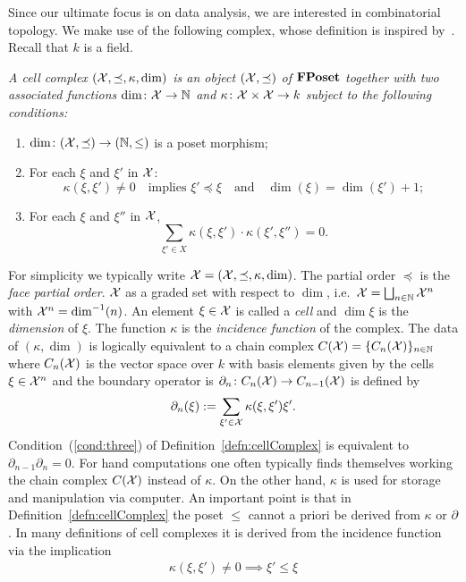 Since our ultimate focus is on data analysis, we are interested in combinatorial topology.  We make use of the following complex, whose definition is inspired by~\cite{lefschetz}.  Recall that $k$ is a field.

\begin{defn}
\label{defn:cellComplex}
{\em
A {\em cell complex} $({\mathcal X},\preceq,\kappa,\dim)$ is an object $({\mathcal X},\preceq)$ of ${\bf FPoset}$ together with two associated functions $\dim\colon {\mathcal X}\to {\mathbb{N}}$ and $\kappa\colon {\mathcal X}\times {\mathcal X}\to k$ subject to the following conditions:
\begin{enumerate}
\item $\dim\colon({\mathcal X},\preceq)\to ({\mathbb{N}},\leq)$ is a poset morphism;
\item  For each $\xi$ and $\xi'$ in ${\mathcal X}$:
\[
\kappa(\xi,\xi')\neq 0\quad\text{implies } \xi'\preceq \xi \quad\text{and}\quad \dim(\xi) = \dim(\xi')+1;
\]
\item\label{cond:three} For each $\xi$ and $\xi''$ in ${\mathcal X}$,
\[
\sum_{\xi'\in X} \kappa(\xi,\xi')\cdot \kappa(\xi',\xi'')=0.
\]
\end{enumerate}
}
\end{defn}

For simplicity we typically write ${\mathcal X}=({\mathcal X},\preceq,\kappa,\dim)$.  
The partial order $\preceq$ is the {\em face partial order}.
${\mathcal X}$ as a graded set with respect to $\dim$, i.e.\ ${\mathcal X} = \bigsqcup_{n\in {\mathbb{N}}} {\mathcal X}^n$ with ${\mathcal X}^n = \dim^{-1}(n)$.  
An element $\xi\in {\mathcal X}$ is called a {\em cell} and $\dim \xi$ is the {\em dimension} of $\xi$. 
The function $\kappa$ is the {\em incidence function} of the complex.    The data of $(\kappa,\dim)$ is logically equivalent to a chain complex $C({\mathcal X}) = \{C_n({\mathcal X})\}_{n\in{\mathbb{N}}}$ where $C_n({\mathcal X})$ is the vector space over $k$ with basis elements given by the cells $\xi\in {\mathcal X}^n$ and the boundary operator is $\partial_n\colon C_n({\mathcal X}) \to C_{n-1}({\mathcal X})$ is defined by
\[
\partial_n( \xi) := \sum_{\xi' \in {\mathcal X}} \kappa(\xi, \xi')\xi'.
\]
Condition~(\ref{cond:three}) of Definition~\ref{defn:cellComplex} is equivalent to $\partial_{n-1}\partial_n = 0$.  For hand computations one often typically finds themselves working the chain complex $C({\mathcal X})$ instead of $\kappa$.  On the other hand, $\kappa$ is used for storage and manipulation via computer.  An important point is that in Definition~\ref{defn:cellComplex} the poset $\leq$ cannot a priori be derived from $\kappa$ or $\partial$.    In many definitions of cell complexes it is derived from the incidence function via the implication
\begin{align}\label{eqn:poset}
\kappa (\xi,\xi')\neq 0 \implies \xi'\leq \xi
\end{align}

